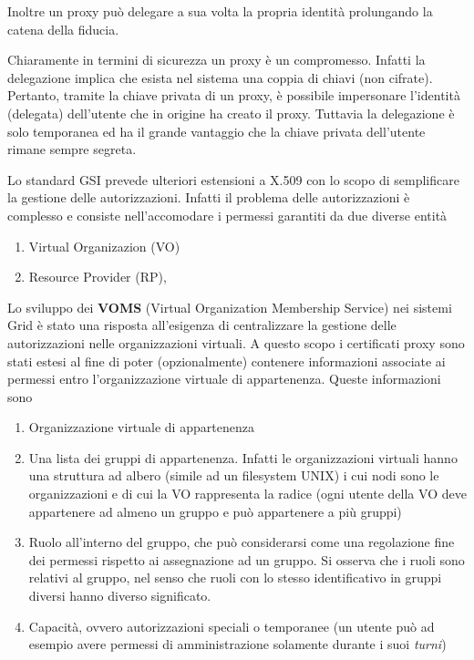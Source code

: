\documentclass[italian,]{article}
\providecommand{\tightlist}{%
  \setlength{\itemsep}{0pt}\setlength{\parskip}{0pt}}
\begin{document}
Inoltre un proxy può delegare a sua volta la propria identità
prolungando la catena della fiducia.

Chiaramente in termini di sicurezza un proxy è un compromesso. Infatti
la delegazione implica che esista nel sistema una coppia di chiavi (non
cifrate). Pertanto, tramite la chiave privata di un proxy, è possibile
impersonare l'identità (delegata) dell'utente che in origine ha creato
il proxy. Tuttavia la delegazione è solo temporanea ed ha il grande
vantaggio che la chiave privata dell'utente rimane sempre segreta.

Lo standard GSI prevede ulteriori estensioni a X.509 con lo scopo di
semplificare la gestione delle autorizzazioni. Infatti il problema delle
autorizzazioni è complesso e consiste nell'accomodare i permessi
garantiti da due diverse entità

\begin{enumerate}
\def\labelenumi{\arabic{enumi}.}
\tightlist
\item
  Virtual Organizazion (VO)
\item
  Resource Provider (RP),
\end{enumerate}

Lo sviluppo dei \textbf{VOMS} (Virtual Organization Membership Service)
nei sistemi Grid è stato una risposta all'esigenza di centralizzare la
gestione delle autorizzazioni nelle organizzazioni virtuali. A questo
scopo i certificati proxy sono stati estesi al fine di poter
(opzionalmente) contenere informazioni associate ai permessi entro
l'organizzazione virtuale di appartenenza. Queste informazioni sono

\begin{enumerate}
\def\labelenumi{\arabic{enumi}.}
\tightlist
\item
  Organizzazione virtuale di appartenenza
\item
  Una lista dei gruppi di appartenenza. Infatti le organizzazioni
  virtuali hanno una struttura ad albero (simile ad un filesystem UNIX)
  i cui nodi sono le organizzazioni e di cui la VO rappresenta la radice
  (ogni utente della VO deve appartenere ad almeno un gruppo e può
  appartenere a più gruppi)
\item
  Ruolo all'interno del gruppo, che può considerarsi come una
  regolazione fine dei permessi rispetto ai assegnazione ad un gruppo.
  Si osserva che i ruoli sono relativi al gruppo, nel senso che ruoli
  con lo stesso identificativo in gruppi diversi hanno diverso
  significato.
\item
  Capacità, ovvero autorizzazioni speciali o temporanee (un utente può
  ad esempio avere permessi di amministrazione solamente durante i suoi
  \emph{turni})
\end{enumerate}
\end{document}
